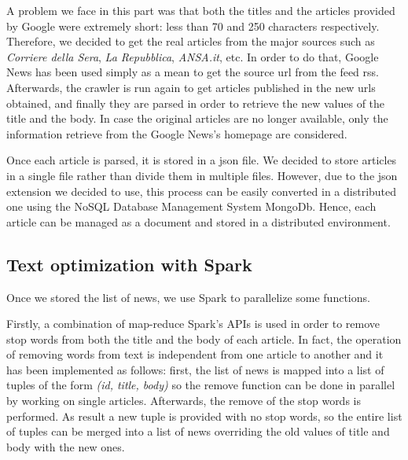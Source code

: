 \documentclass{acm_proc_article-sp}
\begin{document}
A problem we face in this part was that both the titles and the articles provided by Google were extremely short: less than 70 and 250 characters respectively. Therefore, we decided to get the real articles from the major sources such as \textit{Corriere della Sera}, \textit{La Repubblica}, \textit{ANSA.it}, etc. In order to do that, Google News has been used simply as a mean to get the source url from the feed rss. Afterwards, the crawler is run again to get articles published in the new urls obtained, and finally they are parsed in order to retrieve the new values of the title and the body. In case the original articles are no longer available, only the information retrieve from the Google News's homepage are considered.

Once each article is parsed, it is stored in a json file. We decided to store articles in a single file rather than divide them in multiple files. However, due to the json extension we decided to use, this process can be easily converted in a distributed one using the NoSQL Database Management System MongoDb. Hence, each article can be managed as a document and stored in a distributed environment.

\subsection{Text optimization with Spark}
\vspace{2mm}
Once we stored the list of news, we use Spark to parallelize some functions.


Firstly, a combination of map-reduce Spark's APIs is used in order to remove stop words from both the title and the body of each article. In fact, the operation of removing words from text is independent from one article to another and it has been implemented as follows: first, the list of news is mapped into a list of tuples of the form \textit{(id, title, body)} so the remove function can be done in parallel by working on single articles. Afterwards, the remove of the stop words is performed. As result a new tuple is provided with no stop words, so the entire list of tuples can be merged into a list of news overriding the old values of title and body with the new ones.

\end{document}
